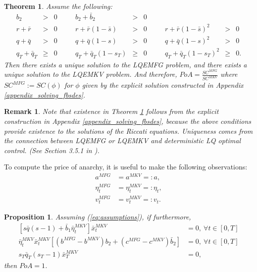 \documentclass[11pt]{article}
\newtheorem{remark}{Remark}
\newtheorem{theorem}{Theorem}
\newtheorem{proposition}{Proposition}
\begin{document}
\begin{theorem} \label{th:exist_uniq}
Assume the following:
\begin{equation}
\begin{array}{rclcrclcrcl}
    b_2 &>& 0 & & b_2 + \bar{b}_2 &>& 0 & & \\
    r+\bar{r} &>&0 &&  r+\bar{r}(1-\bar{s}) &>&0 & & r+\bar{r}(1-\bar{s})^2 &>& 0 \\
    q+\bar{q} &>& 0 && q + \bar{q}(1-s) &>& 0 & & q+ \bar{q}(1-s)^2 &>& 0 \\
    q_T + \bar{q}_T &\geq& 0 & \quad & q_T + \bar{q}_T(1-s_T) &\geq& 0 & \quad & q_T + \bar{q}_T(1-s_T)^2 &\geq& 0.
\end{array}
\label{eq:assumptions}
\end{equation}
Then there exists a unique solution to the LQEMFG problem, and there exists a unique solution to the LQEMKV problem. And therefore, $PoA=\frac{SC^{MFG}}{SC^{MKV}}$ where $SC^{MFG}:=SC(\phi)$ for $\phi$ given by the explicit solution constructed in Appendix \ref{appendix_solving_fbsdes}.
\end{theorem}

\begin{remark}
    Note that existence in Theorem \ref{th:exist_uniq} follows from the explicit construction in Appendix \ref{appendix_solving_fbsdes}, because the above conditions provide existence to the solutions of the Riccati equations. Uniqueness comes from the connection between LQEMFG or LQEMKV and deterministic LQ optimal control. (See Section 3.5.1 in \cite{Carmona_book}).
\end{remark}

To compute the price of anarchy, it is useful to make the following observations:
\begin{equation*}
\begin{split}
    a^{MFG}&=a^{MKV}=:a, \\
    \eta_t^{MFG}&=\eta_t^{MKV}=:\eta_t, \\
    v_t^{MFG}&=v_t^{MKV}=:v_t.
\end{split}
\end{equation*}

\begin{proposition}
Assuming (\ref{eq:assumptions}), if furthermore,
\begin{equation*}
\begin{split}
    \left[s\bar{q}(s-1)+\bar{b}_1\bar{\eta}_t^{MKV}\right]\bar{x}_t^{MKV}&=0,\ \forall t \in [0,T] \\
    \bar{\eta}_t^{MKV}\bar{x}_t^{MKV}\left[(b^{MFG}-b^{MKV})b_2+(c^{MFG}-c^{MKV})\bar{b}_2\right]&=0,\ \forall t \in [0,T] \\
    s_T\bar{q}_T(s_T-1)\bar{x}_T^{MKV}&=0,
\end{split}
\end{equation*}
then $PoA=1$.
\label{eq:lq_prop}
\end{proposition}
\end{document}
